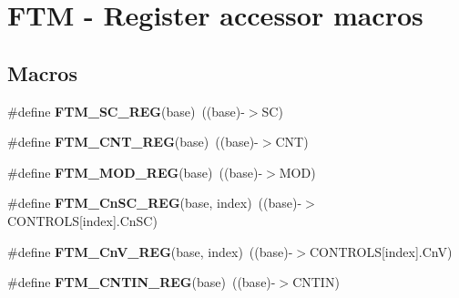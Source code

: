 \hypertarget{group__FTM__Register__Accessor__Macros}{}\section{F\+TM -\/ Register accessor macros}
\label{group__FTM__Register__Accessor__Macros}
\subsection*{Macros}
\begin{DoxyCompactItemize}
\item 
\#define {\bfseries F\+T\+M\+\_\+\+S\+C\+\_\+\+R\+EG}(base)~((base)-\/$>$SC)\hypertarget{group__FTM__Register__Accessor__Macros_gad1cbc88d5f7249287adb5366754deff1}{}\label{group__FTM__Register__Accessor__Macros_gad1cbc88d5f7249287adb5366754deff1}

\item 
\#define {\bfseries F\+T\+M\+\_\+\+C\+N\+T\+\_\+\+R\+EG}(base)~((base)-\/$>$C\+NT)\hypertarget{group__FTM__Register__Accessor__Macros_gad0b4abc8f99226e22d6bc6a1126a8e47}{}\label{group__FTM__Register__Accessor__Macros_gad0b4abc8f99226e22d6bc6a1126a8e47}

\item 
\#define {\bfseries F\+T\+M\+\_\+\+M\+O\+D\+\_\+\+R\+EG}(base)~((base)-\/$>$M\+OD)\hypertarget{group__FTM__Register__Accessor__Macros_ga880a1e0932f25d719922642bf24a0759}{}\label{group__FTM__Register__Accessor__Macros_ga880a1e0932f25d719922642bf24a0759}

\item 
\#define {\bfseries F\+T\+M\+\_\+\+Cn\+S\+C\+\_\+\+R\+EG}(base,  index)~((base)-\/$>$C\+O\+N\+T\+R\+O\+LS\mbox{[}index\mbox{]}.Cn\+SC)\hypertarget{group__FTM__Register__Accessor__Macros_gac7ab18f1e82c379833dbaf01e0541691}{}\label{group__FTM__Register__Accessor__Macros_gac7ab18f1e82c379833dbaf01e0541691}

\item 
\#define {\bfseries F\+T\+M\+\_\+\+Cn\+V\+\_\+\+R\+EG}(base,  index)~((base)-\/$>$C\+O\+N\+T\+R\+O\+LS\mbox{[}index\mbox{]}.CnV)\hypertarget{group__FTM__Register__Accessor__Macros_gade9634b08289e23283d65e0b85aa8f2b}{}\label{group__FTM__Register__Accessor__Macros_gade9634b08289e23283d65e0b85aa8f2b}

\item 
\#define {\bfseries F\+T\+M\+\_\+\+C\+N\+T\+I\+N\+\_\+\+R\+EG}(base)~((base)-\/$>$C\+N\+T\+IN)\hypertarget{group__FTM__Register__Accessor__Macros_gad2208d9641bb52d062344f3bbf467d6d}{}\label{group__FTM__Register__Accessor__Macros_gad2208d9641bb52d062344f3bbf467d6d}


\end{DoxyCompactItemize}
